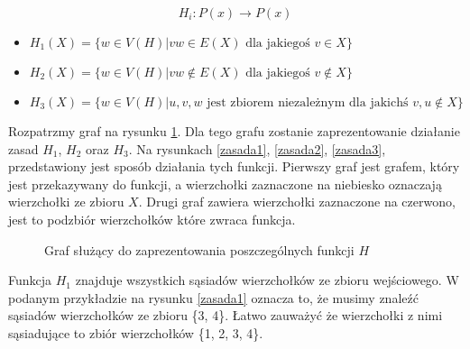 $$H_i: P(x) \to P(x)$$

\begin{itemize}
    
  \item   $H_1(X) = \{ w \in V(H) | vw \in E(X) \textrm{ dla jakiegoś } v \in X \}$ 
  
  \item   $H_2(X) = \{ w \in V(H) | vw \notin E(X) \textrm{ dla jakiegoś } v \notin X\}$
  
  \item   $H_3(X) = \{ w \in V(H) | { u, v, w } \textrm{ jest zbiorem niezależnym dla jakichś } v, u \notin X\}$ 
\end{itemize}


Rozpatrzmy graf na rysunku \ref{zasada0}. Dla tego grafu zostanie zaprezentowanie działanie zasad  $H_1$,  $H_2$ oraz  $H_3$. Na rysunkach \ref{zasada1}, \ref{zasada2}, \ref{zasada3}, przedstawiony jest sposób działania tych funkcji. Pierwszy graf jest grafem, który jest przekazywany do funkcji, a wierzchołki zaznaczone na niebiesko oznaczają wierzchołki ze zbioru $X$. Drugi graf zawiera wierzchołki zaznaczone na czerwono, jest to podzbiór wierzchołków które zwraca funkcja.


 \begin{figure}[H]
  \centering
    \caption{Graf służący do zaprezentowania poszczególnych funkcji $H$}
 \label{zasada0}
 \end{figure}

Funkcja $H_1$ znajduje wszystkich sąsiadów wierzchołków ze zbioru wejściowego. W podanym przykładzie na rysunku \ref{zasada1} oznacza to, że musimy znaleźć sąsiadów wierzchołków ze zbioru \{3, 4\}. Łatwo zauważyć że wierzchołki z nimi sąsiadujące to zbiór wierzchołków \{1, 2, 3, 4\}.

